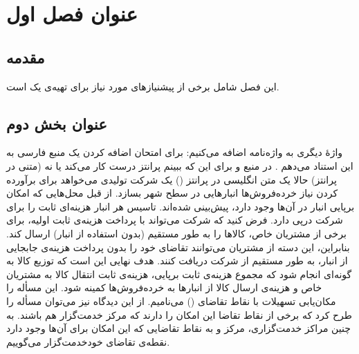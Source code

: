 \chapter{عنوان فصل اول }
\section{مقدمه}
این فصل
 شامل برخی از پیشنیازهای  مورد نیاز برای تهیه‌ی یک   است.
\section{عنوان بخش دوم}
واژهٔ دیگری به واژه‌نامه اضافه می‌کنیم: 
برای امتحان اضافه کردن یک منبع فارسی به این استناد می‌دهم \cite{irscholar494611}. در منبع   \cite{glasner2007enveloping} و \cite{diestel2012sequences} برای این که ببینم پرانتز درست کار می‌کند یا نه (متنی در پرانتز) حالا یک متن انگلیسی در پرانتز ()
یک شرکت   تولیدی می‌خواهد برای برآورده کردن نیاز خرده‌فروش‌ها انبارهایی در سطح شهر بسازد. از قبل محل‌هایی که امکان برپایی انبار در آن‌ها وجود دارد، پیش‌بینی شده‌اند. تاسیس هر انبار هزینه‌‌ای ثابت را برای شرکت درپی دارد. فرض کنید که شرکت می‌تواند با پرداخت هزینه‌ی ثابت اولیه، برای برخی از مشتریان خاص، کالاها را به طور مستقیم (بدون استفاده از انبار) ارسال کند. بنابراین، این دسته از مشتریان می‌توانند تقاضای خود را  بدون  پرداخت هزینه‌ی جابجایی از انبار، به طور مستقیم از شرکت دریافت کنند. هدف نهایی این است که توزیع کالا به گونه‌ای انجام شود که مجموع هزینه‌ی ثابت برپایی، هزینه‌ی ثابت انتقال کالا به مشتریان خاص و هزینه‌ی ارسال کالا از انبارها به خرده‌فروش‌ها کمینه شود.  این مسأله را مکان‌یابی تسهیلات با نقاط تقاضای    () می‌نامیم. از این دیدگاه نیز می‌توان مسأله را طرح کرد که برخی از نقاط تقاضا این امکان را دارند که مرکز خدمت‌گزار هم باشند. به چنین مراکز خدمت‌گزاری، مرکز   و به نقاط تقاضایی که این امکان برای آن‌ها وجود دارد  نقطه‌ی تقاضای خودخدمت‌گزار  می‌گوییم. 

